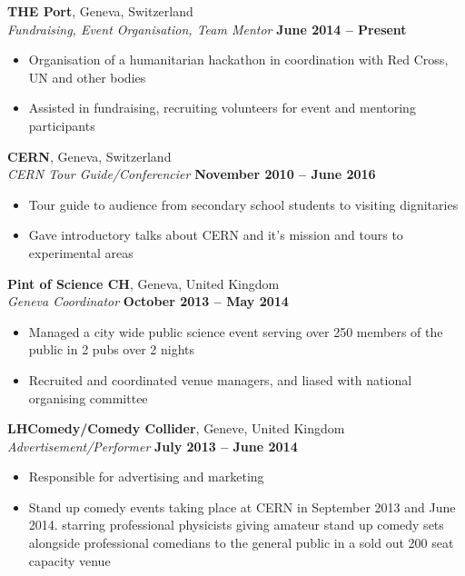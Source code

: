 \documentclass[margin,line]{resume}
\begin{document}
\begin{resume}
    \textbf{THE Port}, Geneva, Switzerland \vspace{2mm}\\\vspace{1mm}%
    \textsl{Fundraising, Event Organisation, Team Mentor} \hfill \textbf{June 2014 -- Present}\\
    \begin{itemize}
    \item{Organisation of a humanitarian hackathon in coordination with Red Cross, UN and other bodies}
    \item{Assisted in fundraising, recruiting volunteers for event and mentoring participants}
    \end{itemize}

    \textbf{CERN}, Geneva, Switzerland \vspace{2mm}\\\vspace{1mm}%
    \textsl{CERN Tour Guide/Conferencier} \hfill \textbf{November 2010 -- June 2016}\\
    \begin{itemize}
    \item{Tour guide to audience from secondary school students to visiting dignitaries}
    \item{Gave introductory talks about CERN and it's mission and tours to experimental areas}
    \end{itemize}

    \textbf{Pint of Science CH}, Geneva, United Kingdom \vspace{2mm}\\\vspace{1mm}%
    \textsl{Geneva Coordinator} \hfill \textbf{October 2013 -- May 2014}\\
    \begin{itemize}
    \item{Managed a city wide public science event serving over 250 members of the public in 2 pubs over 2 nights}
    \item{Recruited and coordinated venue managers, and liased with national organising committee}
    \end{itemize}

    \textbf{LHComedy/Comedy Collider}, Geneve, United Kingdom \vspace{2mm}\\\vspace{1mm}%
    \textsl{Advertisement/Performer} \hfill \textbf{July 2013 -- June 2014}\\
    \begin{itemize}
    \item{Responsible for advertising and marketing}
    \item{Stand up comedy events taking place at CERN in September 2013 and June 2014. starring professional physicists giving amateur stand up comedy sets alongside professional comedians to the general public in a sold out 200 seat capacity venue}
    \end{itemize}




\end{resume}
\end{document}
